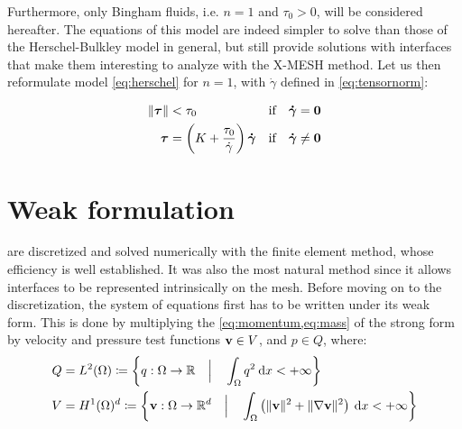 \documentclass[11 pt]{report}
\begin{document}
Furthermore, only Bingham fluids, i.e. $n=1$ and $\tau_0>0$, will be considered hereafter. The equations of this model are indeed simpler to solve than those of the Herschel-Bulkley model in general, but still provide solutions with interfaces that make them interesting to analyze with the X-MESH method. Let us then reformulate model \eqref{eq:herschel} for $n=1$, with $\dot\gamma$ defined in \eqref{eq:tensornorm}:
\begin{empheqboxed}
    \begin{equation}
        \begin{aligned}
            \|\boldsymbol\tau\| &< \tau_0 & \text{if} \quad \gam = \mathbf{0} \\ %
            \boldsymbol{\tau} &= \left(K + \frac{\tau_0}{\dot \gamma}\right) \gam & \text{if} \quad  \gam \neq \mathbf{0} %
        \end{aligned}
        \label{eq:constitutive}
    \end{equation}
\end{empheqboxed}

\section{Weak formulation}
 are discretized and solved numerically with the finite element method, whose efficiency is well established. It was also the most natural method since it allows interfaces to be represented intrinsically on the mesh. Before moving on to the discretization, the system of equations first has to be written under its weak form. This is done by multiplying the \cref{eq:momentum,eq:mass} of the strong form by velocity and pressure test functions $\mathbf{v} \in V$, and $p\in Q$, where:
\begin{align}
    Q &= L^2(\Omega) \coloneqq \left\{q: \Omega \to \mathbb{R} \quad\Big\vert\quad \int_\Omega q^2 \: \dd x < +\infty \right\}\\
    V &= H^1(\Omega)^d \coloneqq \left\{\mathbf{v} : \Omega \to \mathbb{R}^d \quad\Big\vert\quad \int_\Omega \left(\|\mathbf{v}\|^2 + \|\nabla \mathbf{v}\|^2\right)\: \dd x < +\infty\right\}
\end{align}
\end{document}
